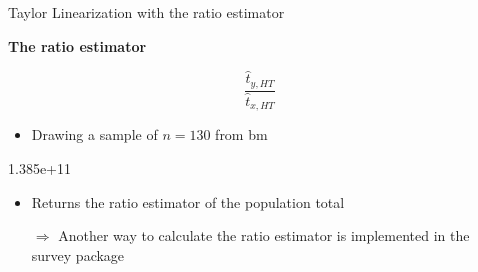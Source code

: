 \documentclass[11pt,german,hideothersubsections]{beamer}
\begin{document}
\begin{frame}[fragile]{Taylor Linearization} {with the ratio estimator}
\footnotesize{
\begin{center}
\textbf{The ratio estimator}
\end{center}
\begin{equation*}
\frac{\hat{t}_{y,HT}}{\hat{t}_{x,HT}}
\end{equation*}
\begin{itemize}
\item Drawing a sample of $n=130$ from bm
\end{itemize}
\begin{Schunk}
\begin{Soutput}
[1] 1.385e+11
\end{Soutput}
\end{Schunk}

\begin{itemize}
\item Returns the ratio estimator of the population total
\item[$\Rightarrow$] Another way to calculate the ratio estimator is implemented in the survey package
\end{itemize}
}
\end{frame}
\end{document}
